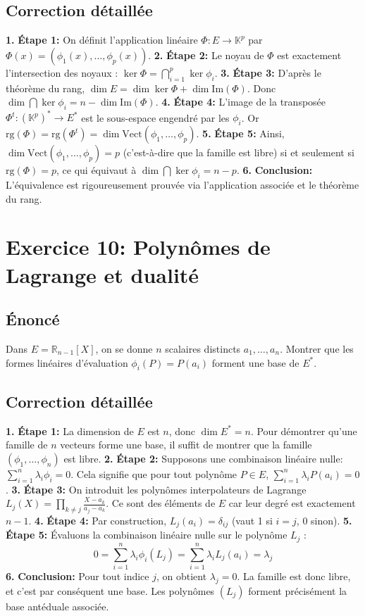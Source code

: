 \documentclass[12pt,a4paper]{report}
\begin{document}
\section{Correction détaillée}
\textbf{1.} \textbf{Étape 1:} On définit l'application linéaire $\Phi : E \to \mathbb{K}^p$ par $\Phi(x) = (\phi_1(x), \dots, \phi_p(x))$.
\textbf{2.} \textbf{Étape 2:} Le noyau de $\Phi$ est exactement l'intersection des noyaux : $\ker \Phi = \bigcap_{i=1}^p \ker \phi_i$.
\textbf{3.} \textbf{Étape 3:} D'après le théorème du rang, $\dim E = \dim \ker \Phi + \dim \text{Im}(\Phi)$. Donc $\dim \bigcap \ker \phi_i = n - \dim \text{Im}(\Phi)$.
\textbf{4.} \textbf{Étape 4:} L'image de la transposée $\Phi^t : (\mathbb{K}^p)^* \to E^*$ est le sous-espace engendré par les $\phi_i$. Or $\text{rg}(\Phi) = \text{rg}(\Phi^t) = \dim \text{Vect}(\phi_1, \dots, \phi_p)$.
\textbf{5.} \textbf{Étape 5:} Ainsi, $\dim \text{Vect}(\phi_1, \dots, \phi_p) = p$ (c'est-à-dire que la famille est libre) si et seulement si $\text{rg}(\Phi) = p$, ce qui équivaut à $\dim \bigcap \ker \phi_i = n - p$.
\textbf{6.} \textbf{Conclusion:} L'équivalence est rigoureusement prouvée via l'application associée et le théorème du rang.

\newpage
\chapter{Exercice 10: Polynômes de Lagrange et dualité}
\section{Énoncé}
Dans $E = \mathbb{R}_{n-1}[X]$, on se donne $n$ scalaires distincts $a_1, \dots, a_n$. Montrer que les formes linéaires d'évaluation $\phi_i(P) = P(a_i)$ forment une base de $E^*$.

\section{Correction détaillée}
\textbf{1.} \textbf{Étape 1:} La dimension de $E$ est $n$, donc $\dim E^* = n$. Pour démontrer qu'une famille de $n$ vecteurs forme une base, il suffit de montrer que la famille $(\phi_1, \dots, \phi_n)$ est libre.
\textbf{2.} \textbf{Étape 2:} Supposons une combinaison linéaire nulle: $\sum_{i=1}^n \lambda_i \phi_i = 0$. Cela signifie que pour tout polynôme $P \in E$, $\sum_{i=1}^n \lambda_i P(a_i) = 0$.
\textbf{3.} \textbf{Étape 3:} On introduit les polynômes interpolateurs de Lagrange $L_j(X) = \prod_{k \neq j} \frac{X-a_k}{a_j-a_k}$. Ce sont des éléments de $E$ car leur degré est exactement $n-1$.
\textbf{4.} \textbf{Étape 4:} Par construction, $L_j(a_i) = \delta_{ij}$ (vaut 1 si $i=j$, 0 sinon).
\textbf{5.} \textbf{Étape 5:} Évaluons la combinaison linéaire nulle sur le polynôme $L_j$ :
   $$0 = \sum_{i=1}^n \lambda_i \phi_i(L_j) = \sum_{i=1}^n \lambda_i L_j(a_i) = \lambda_j$$
\textbf{6.} \textbf{Conclusion:} Pour tout indice $j$, on obtient $\lambda_j = 0$. La famille est donc libre, et c'est par conséquent une base. Les polynômes $(L_j)$ forment précisément la base antéduale associée.
\end{document}
